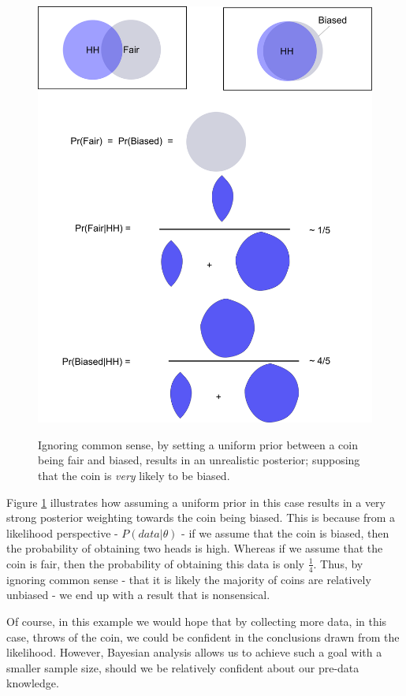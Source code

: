 \documentclass[11pt,fullpage]{book}
\begin{document}
\begin{figure}
\centering
\scalebox{0.1} 
{\includegraphics{Prior_priorJustificationCoin.png}}
\caption{Ignoring common sense, by setting a uniform prior between a coin being fair and biased, results in an unrealistic posterior; supposing that the coin is \textit{very} likely to be biased.}\label{fig:Prior_priorJustificationCoin}
\end{figure}

Figure \ref{fig:Prior_priorJustificationCoin} illustrates how assuming a uniform prior in this case results in a very strong posterior weighting towards the coin being biased. This is because from a likelihood perspective - $P(data|\theta)$ - if we assume that the coin is biased, then the probability of obtaining two heads is high. Whereas if we assume that the coin is fair, then the probability of obtaining this data is only $\frac{1}{4}$. Thus, by ignoring common sense - that it is likely the majority of coins are relatively unbiased - we end up with a result that is nonsensical. 

Of course, in this example we would hope that by collecting more data, in this case, throws of the coin, we could be confident in the conclusions drawn from the likelihood. However, Bayesian analysis allows us to achieve such a goal with a smaller sample size, should we be relatively confident about our pre-data knowledge.
\end{document}
